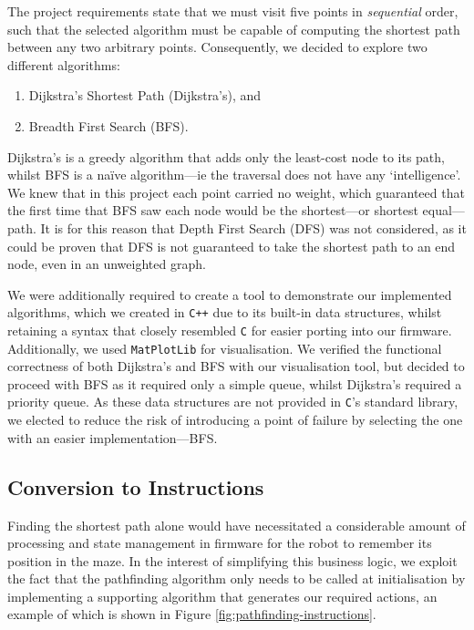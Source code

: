 \documentclass[conference]{IEEEtran}
\begin{document}
The project requirements state that we must visit five points in \emph{sequential} order, such that the selected algorithm must be capable of computing the shortest path between any two arbitrary points.
Consequently, we decided to explore two different algorithms:
\begin{enumerate}
	\item Dijkstra's Shortest Path (Dijkstra's), and
	\item Breadth First Search (BFS).
\end{enumerate}
Dijkstra's is a greedy algorithm that adds only the least-cost node to its path, whilst BFS is a naïve algorithm—ie the traversal does not have any `intelligence'.
We knew that in this project each point carried no weight, which guaranteed that the first time that BFS saw each node would be the shortest—or shortest equal—path.
It is for this reason that Depth First Search (DFS) was not considered, as it could be proven that DFS is not guaranteed to take the shortest path to an end node, even in an unweighted graph.

We were additionally required to create a tool to demonstrate our implemented algorithms, which we created in \texttt{C++} due to its built-in data structures, whilst retaining a syntax that closely resembled \texttt{C} for easier porting into our firmware.
Additionally, we used \texttt{MatPlotLib} for visualisation.
We verified the functional correctness of both Dijkstra's and BFS with our visualisation tool, but decided to proceed with BFS as it required only a simple queue, whilst Dijkstra's required a priority queue.
As these data structures are not provided in \texttt{C}'s standard library, we elected to reduce the risk of introducing a point of failure by selecting the one with an easier implementation—BFS.

\subsection{Conversion to Instructions}

Finding the shortest path alone would have necessitated a considerable amount of processing and state management in firmware for the robot to remember its position in the maze.
In the interest of simplifying this business logic, we exploit the fact that the pathfinding algorithm only needs to be called at initialisation by implementing a supporting algorithm that generates our required actions, an example of which is shown in Figure \ref{fig:pathfinding-instructions}.
\end{document}
